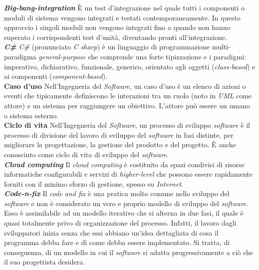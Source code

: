 \textbf{\textit{Big-bang-integration}} È un test d'integrazione nel quale tutti i componenti o moduli di sistema vengono integrati e testati contemporaneamente.
In questo approccio i singoli moduli non vengono integrati fino a quando non hanno superato i corrispondenti test
d'unità, diventando pronti all'integrazione.\\

\textbf{\textit{C\#}} \textit{C\#} (pronunciato \textit{C sharp}) è un linguaggio di programmazione multi-paradigma \textit{general-purpose} che comprende una forte tipizzazione e i paradigmi: imperativo, dichiarativo, funzionale, generico, orientato agli oggetti (\textit{class-based}) e ai componenti (\textit{component-based}).\\

\textbf{Caso d'uso} Nell'Ingegneria del \textit{Software}, un caso d'uso è un elenco di azioni o eventi che tipicamente definiscono le interazioni tra un ruolo (noto in \textit{UML} come attore) e un sistema per raggiungere un obiettivo. L'attore può essere un umano o sistema esterno.\\

\textbf{Ciclo di vita} Nell'Ingegneria del \textit{Software}, un processo di sviluppo \textit{software} è il processo di divisione del lavoro di sviluppo del \textit{software} in fasi distinte, per migliorare la progettazione, la gestione del prodotto e del progetto. È anche conosciuto come ciclo di vita di sviluppo del \textit{software}.\\

\textbf{\textit{Cloud computing}} Il \textit{cloud computing} è costituito da spazi condivisi di risorse informatiche configurabili e servizi di \textit{higher-level} che possono essere rapidamente forniti con il minimo sforzo di gestione, spesso su \textit{Internet}.\\

\textbf{\textit{Code-n-fix}} Il \textit{code and fix} è una pratica molto comune nello sviluppo del \textit{software} e non è considerato un vero e proprio modello di sviluppo del \textit{software}. Esso è assimilabile ad un modello iterativo che si alterna in due fasi, il quale è quasi totalmente privo di organizzazione del processo. Infatti, il lavoro dagli sviluppatori inizia senza che essi abbiano un'idea dettagliata di cosa il programma debba fare e di come debba essere implementato. Si tratta, di conseguenza, di un modello in cui il \textit{software} si adatta progressivamente a ciò che il suo progettista desidera. \\

